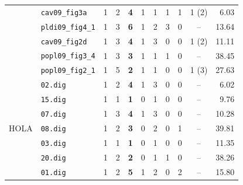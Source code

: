 \documentclass[runningheads]{llncs}
\newcommand{\code}[1]{\texttt{\small #1}}
\begin{document}
\begin{table}[h!]
\begin{tabular}{llccrcccccr}
& \code{cav09\_fig3a}    & 1 & 2 & \textbf{4}  & 1 & 1  & 1 & 1 & 1 (2) & 6.03 \\
& \code{pldi09\_fig4\_1} & 1 & 3 & \textbf{6}  & 1 & 2  & 3 & 0 & --    & 13.64 \\
& \code{cav09\_fig2d}    & 1 & 3 & \textbf{4}  & 1 & 3  & 0 & 0 & 1 (2) & 11.11 \\
& \code{popl09\_fig3\_4}  & 1 & 3 & \textbf{3}  & 1 & 1  & 1 & 0 & --    & 38.45 \\
& \code{popl09\_fig2\_1}  & 1 & 5 & \textbf{2}  & 1 & 1  & 0 & 0 & 1 (3) & 27.63 \\
\midrule
\multirow{7}{*}{HOLA}
& \code{02.dig}          & 1 & 2 & \textbf{4}  & 1 & 3  & 0 & 0 & --    & 6.02 \\
& \code{15.dig}          & 1 & 1 & \textbf{1}  & 0 & 1  & 0 & 0 & --    & 9.76 \\
& \code{07.dig}          & 1 & 3 & \textbf{4}  & 1 & 3  & 0 & 0 & --    & 10.28 \\
& \code{08.dig}          & 1 & 2 & \textbf{3}  & 0 & 2  & 0 & 1 & --    & 39.81 \\
& \code{03.dig}          & 1 & 1 & \textbf{1}  & 0 & 1  & 0 & 0 & --    & 11.35 \\
& \code{20.dig}          & 1 & 2 & \textbf{2}  & 0 & 1  & 1 & 0 & --    & 38.26 \\
& \code{01.dig}          & 1 & 2 & \textbf{5}  & 1 & 2  & 0 & 2 & --    & 15.80 \\
\bottomrule
\end{tabular}
\end{table}
\end{document}
